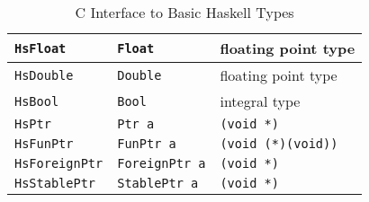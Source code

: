 \documentclass[a4paper,twosides]{article}
\newcommand{\code}[1]{\texttt{#1}}      %
\begin{document}
\begin{table}
\begin{center}
\begin{tabular}{|l|l|l|}
      \hline
      \code{HsFloat}    & \code{Float}
      & floating point type\\
     \hline
      \code{HsDouble}   & \code{Double}
      & floating point type\\
     \hline
      \code{HsBool}     & \code{Bool}
      & integral type\\
     \hline
      \code{HsPtr}      & \code{Ptr a}
      & \code{(void *)}\\
     \hline
      \code{HsFunPtr}   & \code{FunPtr a}
      & \code{(void (*)(void))}\\
     \hline
      \code{HsForeignPtr}& \code{ForeignPtr a}
      & \code{(void *)}\\
     \hline
      \code{HsStablePtr}& \code{StablePtr a}
      & \code{(void *)}\\
     \hline
    \end{tabular}
    \caption{C Interface to Basic Haskell Types}
    \label{tab:c-haskell-types}
  \end{center}
\end{table}
%
\end{document}
